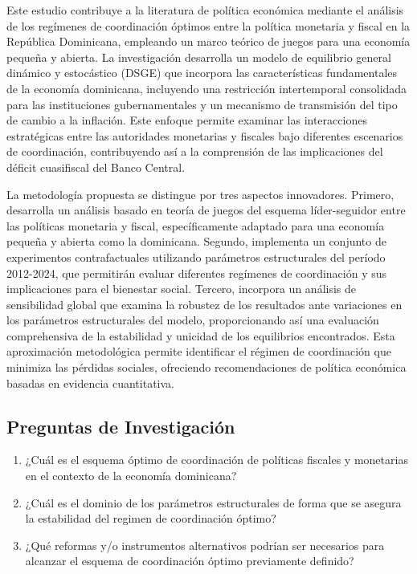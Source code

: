 \documentclass[
  man,
  longtable,
  nolmodern,
  notxfonts,
  notimes,
  colorlinks=true,linkcolor=blue,citecolor=blue,urlcolor=blue]{apa7}
\begin{document}
Este estudio contribuye a la literatura de política económica mediante
el análisis de los regímenes de coordinación óptimos entre la política
monetaria y fiscal en la República Dominicana, empleando un marco
teórico de juegos para una economía pequeña y abierta. La investigación
desarrolla un modelo de equilibrio general dinámico y estocástico (DSGE)
que incorpora las características fundamentales de la economía
dominicana, incluyendo una restricción intertemporal consolidada para
las instituciones gubernamentales y un mecanismo de transmisión del tipo
de cambio a la inflación. Este enfoque permite examinar las
interacciones estratégicas entre las autoridades monetarias y fiscales
bajo diferentes escenarios de coordinación, contribuyendo así a la
comprensión de las implicaciones del déficit cuasifiscal del Banco
Central.

La metodología propuesta se distingue por tres aspectos innovadores.
Primero, desarrolla un análisis basado en teoría de juegos del esquema
líder-seguidor entre las políticas monetaria y fiscal, específicamente
adaptado para una economía pequeña y abierta como la dominicana.
Segundo, implementa un conjunto de experimentos contrafactuales
utilizando parámetros estructurales del período 2012-2024, que
permitirán evaluar diferentes regímenes de coordinación y sus
implicaciones para el bienestar social. Tercero, incorpora un análisis
de sensibilidad global que examina la robustez de los resultados ante
variaciones en los parámetros estructurales del modelo, proporcionando
así una evaluación comprehensiva de la estabilidad y unicidad de los
equilibrios encontrados. Esta aproximación metodológica permite
identificar el régimen de coordinación que minimiza las pérdidas
sociales, ofreciendo recomendaciones de política económica basadas en
evidencia cuantitativa.

\subsection{Preguntas de
Investigación}\label{preguntas-de-investigaciuxf3n}

\begin{enumerate}
\def\labelenumi{\arabic{enumi}.}
\item
  ¿Cuál es el esquema óptimo de coordinación de políticas fiscales y
  monetarias en el contexto de la economía dominicana?
\item
  ¿Cuál es el dominio de los parámetros estructurales de forma que se
  asegura la estabilidad del regimen de coordinación óptimo?
\item
  ¿Qué reformas y/o instrumentos alternativos podrían ser necesarios
  para alcanzar el esquema de coordinación óptimo previamente definido?
\end{enumerate}
\end{document}
